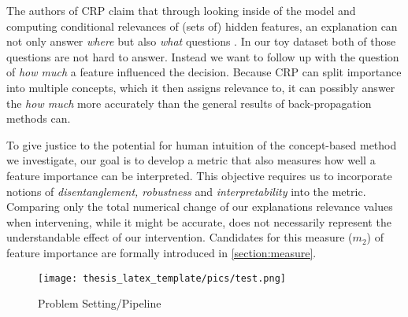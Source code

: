 The authors of CRP claim that through looking inside of the model and computing conditional relevances of (sets of) hidden features, an explanation can not only answer \textit{where} but also \textit{what} questions \cite{Achtibat2022}. In our toy dataset both of those questions are not hard to answer. Instead we want to follow up with the question of \textit{how much} a feature influenced the decision. Because CRP can split importance into multiple concepts, which it then assigns relevance to, it can possibly answer the \textit{how much} more accurately than the general results of back-propagation methods can.  


To give justice to the potential for human intuition of the concept-based method we investigate, our goal is to develop a metric that also measures how well a feature importance can be interpreted. This objective requires us to incorporate notions of \textit{disentanglement, robustness} and \textit{interpretability} into the metric. Comparing only the total numerical change of our explanations relevance values when intervening, while it might be accurate, does not necessarily represent the understandable effect of our intervention. 
Candidates for this measure ($m_2$) of feature importance are formally introduced in \autoref{section:measure}.

\begin{figure}
    \centering
    \texttt{[image: thesis\_latex\_template/pics/test.png]}
    \caption{Problem Setting/Pipeline}
    \label{fig:pipeline}
\end{figure}

